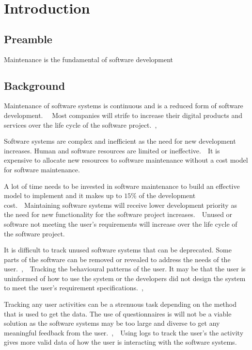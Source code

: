 \chapter{Introduction}
\label{chap:1}

\section{Preamble}
Maintenance is the fundamental of software development \cite{Levin2019}

\section{Background}

Maintenance of software systems is continuous and is a reduced form of software
development.~\cite{Sneed2004}~ Most companies will strife to increase their
digital products and services over the life cycle of the software
project.~\cite{Niu2018},~\cite{Galster2019}\par Software systems are complex and
inefficient as the need for new development increases. Human and software
resources are limited or ineffective.~\cite{Pecchia2015}~It is expensive to
allocate new resources to software maintenance without a cost model for software
maintenance.~\cite{Galster2019}\par A lot of time needs to be invested in
software maintenance to build an effective model to implement and it makes up to
$15\%$ of the development cost.~\cite{Lenarduzzi2017}~Maintaining software
systems will receive lower development priority as the need for new
functionality for the software project increases.~\cite{Sneed2004}~Unused or
software not meeting the user's requirements will increase over the life cycle
of the software project.~\cite{Thankachan2018}\par It is difficult to track
unused software systems that can be deprecated. Some parts of the software can
be removed or revealed to address the needs of the
user.~\cite{Dalpiaz2018},~\cite{Shahid2016}~Tracking the behavioural patterns of
the user. It may be that the user is uninformed of how to use the system or the
developers did not design the system to meet the user's requirement
specifications.~\cite{Slaninova2014},~\cite{Chen2019}\par Tracking any user
activities can be a strenuous task depending on the method that is used to get the
data. The use of questionnaires is will not be a viable solution as the software
systems may be too large and diverse to get any meaningful feedback from the
user.~\cite{Slaninova2014},~\cite{Waqar2017}~Using logs to track the user's
the activity gives more valid data of how the user is interacting with the software
systems.~\cite{Lei2018}

